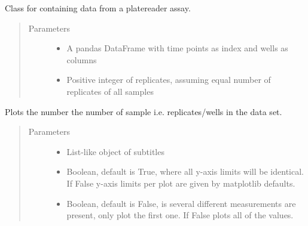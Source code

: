 \documentclass[letterpaper,10pt,english]{sphinxmanual}
\begin{document}
\begin{fulllineitems}
\label{\detokenize{platelib:platelib.plateread.Plate_data}}
Class for containing data from a platereader assay.
\begin{quote}\begin{description}
\item[{Parameters}] \leavevmode\begin{itemize}
\item {} 
 \textendash{} A pandas DataFrame with time points as index and wells as columns

\item {} 
 \textendash{} Positive integer of replicates, assuming equal number of replicates of all samples

\end{itemize}

\end{description}\end{quote}

\begin{fulllineitems}
\label{\detokenize{platelib:platelib.plateread.Plate_data.plot}}
Plots the number the number of sample i.e. replicates/wells in the data 
set.
\begin{quote}\begin{description}
\item[{Parameters}] \leavevmode\begin{itemize}
\item {} 
 \textendash{} List-like object of subtitles

\item {} 
 \textendash{} Boolean, default is True, where all y-axis limits will be identical. If False y-axis limits per plot are given by matplotlib defaults.

\item {} 
 \textendash{} Boolean, default is False, is several different measurements are present, only plot the first one. If False plots all of the values.


\end{itemize}
\end{description}
\end{quote}
\end{fulllineitems}
\end{fulllineitems}
\end{document}
